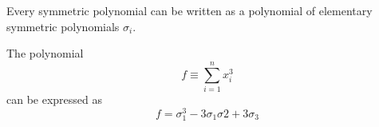   \begin{theorem}
    Every symmetric polynomial can be written as a polynomial of elementary symmetric polynomials $\sigma_i$. 
  \end{theorem}

  \begin{example}
    The polynomial 
    \begin{equation}
      f \equiv \sum_{i=1}^n x_i^3
    \end{equation}
    can be expressed as 
    \begin{equation}
      f = \sigma_1^3 - 3 \sigma_1 \sigma 2 + 3 \sigma_3
    \end{equation}
  \end{example}

